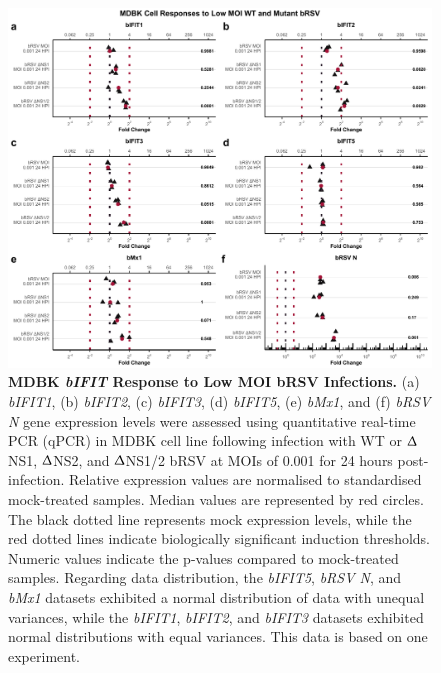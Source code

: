 \begin{figure}
    \centering
    \includegraphics[width=1\linewidth]{07. Chapter 2/Figs/02. Induction/06. mdbk_brsv_low_moi.pdf}
    \caption[MDBK \textit{bIFIT} Response to Low MOI bRSV Infections.]{\textbf{MDBK \textit{bIFIT} Response to Low MOI bRSV Infections.} (a) \textit{bIFIT1}, (b) \textit{bIFIT2}, (c) \textit{bIFIT3}, (d) \textit{bIFIT5}, (e) \textit{bMx1}, and (f) \textit{bRSV N} gene expression levels were assessed using quantitative real-time PCR (qPCR) in MDBK cell line following infection with WT or $\Updelta$NS1, $\Updelta$NS2, and $\Updelta$NS1/2 bRSV at MOIs of 0.001 for 24 hours post-infection. Relative expression values are normalised to standardised mock-treated samples. Median values are represented by red circles. The black dotted line represents mock expression levels, while the red dotted lines indicate biologically significant induction thresholds. Numeric values indicate the p-values compared to mock-treated samples. Regarding data distribution, the \textit{bIFIT5}, \textit{bRSV N}, and \textit{bMx1} datasets exhibited a normal distribution of data with unequal variances, while the \textit{bIFIT1}, \textit{bIFIT2}, and \textit{bIFIT3} datasets exhibited normal distributions with equal variances. This data is based on one experiment.}
    \label{fig:MDBK responses to low MOI mutant bRSV}
\end{figure}

